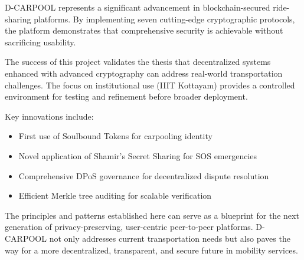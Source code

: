 D-CARPOOL represents a significant advancement in blockchain-secured ride-sharing platforms. By implementing seven cutting-edge cryptographic protocols, the platform demonstrates that comprehensive security is achievable without sacrificing usability.

The success of this project validates the thesis that decentralized systems enhanced with advanced cryptography can address real-world transportation challenges. The focus on institutional use (IIIT Kottayam) provides a controlled environment for testing and refinement before broader deployment.

Key innovations include:

\begin{itemize}
    \item First use of Soulbound Tokens for carpooling identity
    \item Novel application of Shamir's Secret Sharing for SOS emergencies
    \item Comprehensive DPoS governance for decentralized dispute resolution
    \item Efficient Merkle tree auditing for scalable verification
\end{itemize}

The principles and patterns established here can serve as a blueprint for the next generation of privacy-preserving, user-centric peer-to-peer platforms. D-CARPOOL not only addresses current transportation needs but also paves the way for a more decentralized, transparent, and secure future in mobility services.
